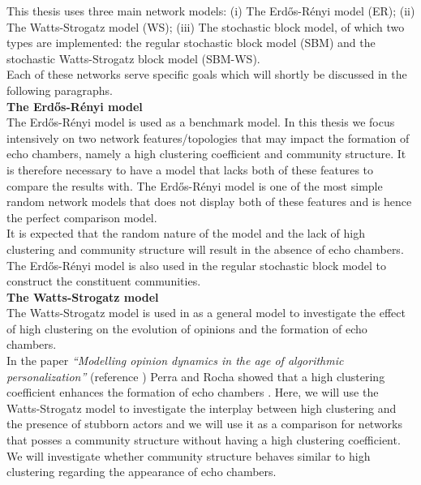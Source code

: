 \documentclass[11 pt , letterpaper , twoside , openright]{book}
\begin{document}
This thesis uses three main network models: (i) The Erd\H{o}s-R\'{e}nyi model (ER); (ii) The Watts-Strogatz model (WS); (iii) The stochastic block model, of which two types are implemented: the regular stochastic block model (SBM) and the stochastic Watts-Strogatz block model (SBM-WS).\\
\newline
Each of these networks serve specific goals which will shortly be discussed in the following paragraphs.\\
\newline
\textbf{The Erd\H{o}s-R\'{e}nyi model}\\
\newline
The Erd\H{o}s-R\'{e}nyi model is used as a benchmark model. In this thesis we focus intensively on two network features/topologies that may impact the formation of echo chambers, namely a high clustering coefficient and community structure. It is therefore necessary to have a model that lacks both of these features to compare the results with. The Erd\H{o}s-R\'{e}nyi model is one of the most simple random network models that does not display both of these features and is hence the perfect comparison model. \\
\newline
It is expected that the random nature of the model and the lack of high clustering and community structure will result in the absence of echo chambers.\\
\newline
The Erd\H{o}s-R\'{e}nyi model is also used in the regular stochastic block model to construct the constituent communities.\\
\newline
\textbf{The Watts-Strogatz model}\\
\newline
The Watts-Strogatz model is used in as a general model to investigate the effect of high clustering on the evolution of opinions and the formation of echo chambers.\\
\newline
In the paper \textit{``Modelling opinion dynamics in the age of algorithmic personalization''} (reference \cite{Perra2019}) Perra and Rocha showed that a high clustering coefficient enhances the formation of echo chambers \cite{Perra2019}. Here, we will use the Watts-Strogatz model to investigate the interplay between high clustering and the presence of stubborn actors and we will use it as a comparison for networks that posses a community structure without having a high clustering coefficient. We will investigate whether community structure behaves similar to high clustering regarding the appearance of echo chambers.\\
\end{document}
